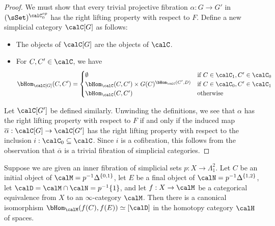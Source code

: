 \begin{proof}
We must show that every trivial projective fibration $\alpha: G \rightarrow G'$ in
$(\sSet)^{\calC_0^{op}}$ has the right lifting property with respect to $F$. 
Define a new simplicial category $\calC[G]$ as follows:
\begin{itemize}
\item[$(i)$] The objects of $\calC[G]$ are the objects of $\calC$.
\item[$(ii)$] For $C, C' \in \calC$, we have
$$ \bHom_{\calC[G]}( C, C' ) = \begin{cases} \emptyset & \text{if } C \in \calC_1, C' \in \calC_0 \\
\bHom_{\calC}(C,C') \times G(C)^{ \bHom_{\calC}( C',D) } & \text{if } C \in \calC_0, C' \in \calC_1 \\
\bHom_{\calC}(C,C') & \text{otherwise} \end{cases}$$
\end{itemize}
Let $\calC[G']$ be defined similarly. Unwinding the definitions, we see that
$\alpha$ has the right lifting property with respect to $F$ if and only if the induced map
$\overline{\alpha}: \calC[G] \rightarrow \calC[G']$ has the right lifting property with
respect to the inclusion $i: \calC_0 \subseteq \calC$. Since $i$ is a cofibration, this follows from the observation that $\overline{\alpha}$ is a trivial fibration of simplicial categories.
\end{proof}

\begin{lemma}\label{cane}
Suppose we are given an inner fibration of simplicial sets $p: X \rightarrow \Lambda^2_1$.
Let $C$ be an initial object of $\calM = p^{-1} \Delta^{ \{0,1\} }$, let $E$ be a final object of
$\calN = p^{-1} \Delta^{ \{1,2\} }$, let $\calD = \calM \cap \calN = p^{-1} \{1\}$, 
and let $f: X \rightarrow \calM$ be a categorical equivalence
from $X$ to an $\infty$-category $\calM$. Then there is a canonical isomorphism
$\bHom_{\calM}( f(C), f(E)) \simeq [\calD]$ in the homotopy category $\calH$ of spaces.
\end{lemma}

